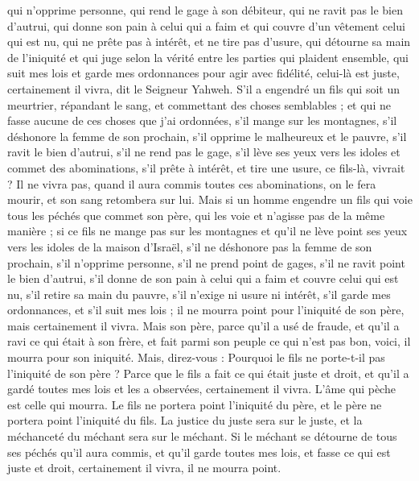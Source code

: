 \begin{multicols}{2}
qui n’opprime personne, qui rend le gage à son débiteur, qui ne ravit pas le bien d'autrui, qui donne son pain à celui qui a faim et qui couvre d'un vêtement celui qui est nu,
qui ne prête pas à intérêt, et ne tire pas d’usure, qui détourne sa main de l'iniquité et qui juge selon la vérité entre les parties qui plaident ensemble,
qui suit mes lois et garde mes ordonnances pour agir avec fidélité, celui-là est juste, certainement il vivra, dit le Seigneur Yahweh.
S’il a engendré un fils qui soit un meurtrier, répandant le sang, et commettant des choses semblables ;
et qui ne fasse aucune de ces choses que j'ai ordonnées, s’il mange sur les montagnes, s’il déshonore la femme de son prochain,
s’il opprime le malheureux et le pauvre, s’il ravit le bien d'autrui, s’il ne rend pas le gage, s’il lève ses yeux vers les idoles et commet des abominations,
s’il prête à intérêt, et tire une usure, ce fils-là, vivrait ? Il ne vivra pas, quand il aura commis toutes ces abominations, on le fera mourir, et son sang retombera sur lui.
Mais si un homme engendre un fils qui voie tous les péchés que commet son père, qui les voie et n’agisse pas de la même manière ;
si ce fils ne mange pas sur les montagnes et qu'il ne lève point ses yeux vers les idoles de la maison d'Israël, s’il ne déshonore pas la femme de son prochain,
s’il n’opprime personne, s’il ne prend point de gages, s’il ne ravit point le bien d'autrui, s’il donne de son pain à celui qui a faim et couvre celui qui est nu,
s’il retire sa main du pauvre, s’il n’exige ni usure ni intérêt, s’il garde mes ordonnances, et s’il suit mes lois ; il ne mourra point pour l'iniquité de son père, mais certainement il vivra.
Mais son père, parce qu'il a usé de fraude, et qu'il a ravi ce qui était à son frère, et fait parmi son peuple ce qui n'est pas bon, voici, il mourra pour son iniquité.
Mais, direz-vous : Pourquoi le fils ne porte-t-il pas l'iniquité de son père ? Parce que le fils a fait ce qui était juste et droit, et qu'il a gardé toutes mes lois et les a observées, certainement il vivra.
L'âme qui pèche est celle qui mourra. Le fils ne portera point l'iniquité du père, et le père ne portera point l'iniquité du fils. La justice du juste sera sur le juste, et la méchanceté du méchant sera sur le méchant.
Si le méchant se détourne de tous ses péchés qu'il aura commis, et qu'il garde toutes mes lois, et fasse ce qui est juste et droit, certainement il vivra, il ne mourra point.

\end{multicols}
